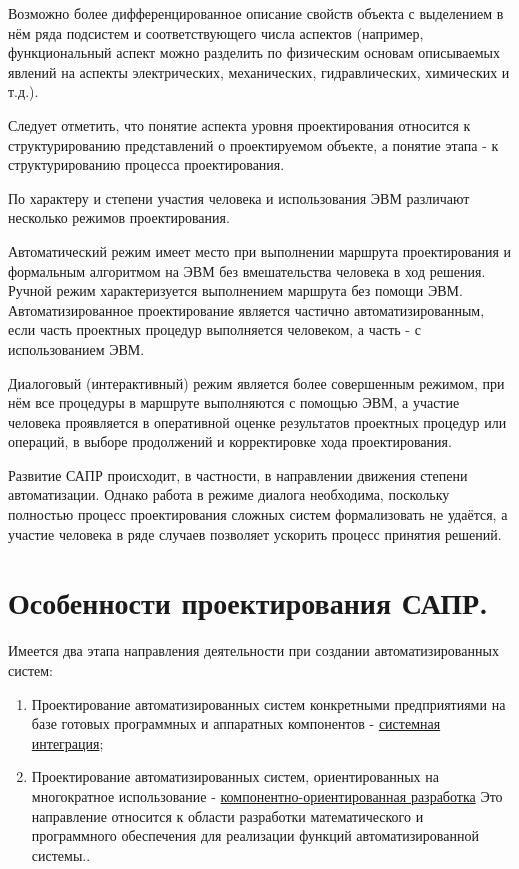 \documentclass[unicode, 12pt, a4paper, oneside]{article}
\begin{document}
Возможно более дифференцированное описание свойств объекта с выделением в нём ряда подсистем и соответствующего числа аспектов (например, функциональный аспект можно разделить по физическим основам описываемых явлений на аспекты электрических, механических, гидравлических, химических и т.д.).

Следует отметить, что понятие аспекта уровня проектирования относится к структурированию представлений о проектируемом объекте, а понятие этапа - к структурированию процесса проектирования. 

По характеру и степени участия человека и использования ЭВМ различают несколько режимов проектирования.

Автоматический режим имеет место при выполнении маршрута проектирования и формальным алгоритмом на ЭВМ без вмешательства человека в ход решения. Ручной режим характеризуется выполнением маршрута без помощи ЭВМ. Автоматизированное проектирование является частично автоматизированным, если часть проектных процедур выполняется человеком, а часть - с использованием ЭВМ. 

Диалоговый (интерактивный) режим является более совершенным режимом, при нём все процедуры в маршруте выполняются с помощью ЭВМ, а участие человека проявляется в оперативной оценке результатов проектных процедур или операций, в выборе  продолжений и корректировке хода проектирования.

Развитие САПР происходит, в частности, в направлении движения степени автоматизации. Однако работа в режиме диалога необходима, поскольку полностью процесс проектирования сложных систем формализовать не удаётся, а участие человека в ряде случаев позволяет ускорить процесс принятия решений.

\section{Особенности проектирования САПР.}

Имеется два этапа направления деятельности при создании автоматизированных систем:

\begin{enumerate}
\item Проектирование автоматизированных систем конкретными предприятиями на базе готовых программных и аппаратных компонентов - \underline{системная интеграция};
\item Проектирование автоматизированных систем, ориентированных на многократное использование - \underline{компонентно-ориентированная разработка} Это направление относится к области разработки математического и программного обеспечения для реализации функций автоматизированной системы..
\end{enumerate}
\end{document}
